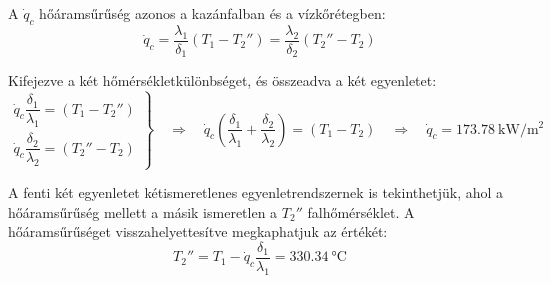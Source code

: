 A $\dot{q}_c$ hőáramsűrűség azonos a kazánfalban és a vízkőrétegben:
\begin{equation}
	\dot{q}_c = \frac{\lambda_1}{\delta_1} (T_1 - T_2'') = \frac{\lambda_2}{\delta_2} (T_2'' - T_2)
\end{equation}

Kifejezve a két hőmérsékletkülönbséget, és összeadva a két egyenletet:
\begin{equation}
	\left.
	\begin{array}{lcl}
		\dot{q}_c \dfrac{\delta_1}{\lambda_1} = (T_1 - T_2'') \\
		\dot{q}_c \dfrac{\delta_2}{\lambda_2} = (T_2'' - T_2)
	\end{array}
	\right\rbrace
	\quad \Rightarrow \quad 
	\dot{q}_c \left(\dfrac{\delta_1}{\lambda_1} + \dfrac{\delta_2}{\lambda_2} \right) = (T_1 - T_2) 
	\quad \Rightarrow \quad 
	\dot{q}_c = 
	\SI{173.78}{\kilo\watt\per\meter\squared}
\end{equation}

A fenti két egyenletet kétismeretlenes egyenletrendszernek is tekinthetjük, ahol a hőáramsűrűség mellett a másik ismeretlen a $T_2''$ falhőmérséklet. A hőáramsűrűséget visszahelyettesítve megkaphatjuk az értékét:
\begin{equation}
	T_2'' = T_1 - \dot{q}_c \dfrac{\delta_1}{\lambda_1} = \SI{330.34}{\celsius}
\end{equation}
\pagebreak

